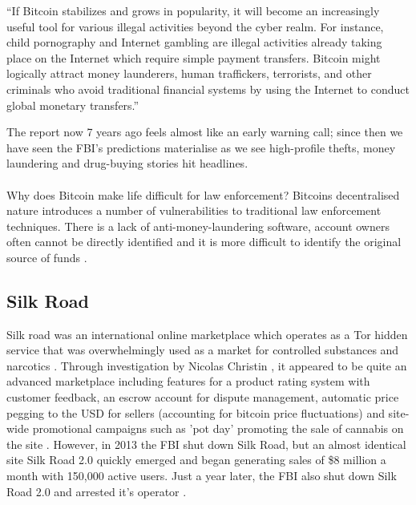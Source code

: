 \begin{displayquote}
 ``If Bitcoin stabilizes and grows in popularity, it will become an increasingly useful tool for various illegal activities beyond the cyber realm. For instance, child pornography and Internet gambling are illegal activities already taking place on the Internet which require simple payment transfers. Bitcoin might logically attract money launderers, human traffickers, terrorists, and other criminals who avoid traditional financial systems by using the Internet to conduct global monetary transfers.''
\end{displayquote}

The report now 7 years ago feels almost like an early warning call; since then we have seen the FBI's predictions materialise as we see high-profile thefts, money laundering and drug-buying stories hit headlines. 
\\\\
Why does Bitcoin make life difficult for law enforcement? Bitcoins decentralised nature introduces a number of vulnerabilities to traditional law enforcement techniques. There is a lack of anti-money-laundering software, account owners often cannot be directly identified and it is more difficult to identify the original source of funds \cite{RefWorks:doc:5c4ad055e4b0ea619646c15a}. 

\subsection{Silk Road}
Silk road was an international online marketplace which operates as a Tor hidden service that was overwhelmingly used as a market for controlled substances and narcotics \cite{RefWorks:doc:5c3e0105e4b0854ae612621e}. Through investigation by Nicolas Christin \cite{RefWorks:doc:5c3e0105e4b0854ae612621e}, it appeared to be quite an advanced marketplace including features for a product rating system with customer feedback, an escrow account for dispute management, automatic price pegging to the USD for sellers (accounting for bitcoin price fluctuations) and site-wide promotional campaigns such as 'pot day' promoting the sale of cannabis on the site \cite{RefWorks:doc:5c3e0105e4b0854ae612621e}. However, in 2013 the FBI shut down Silk Road, but an almost identical site Silk Road 2.0 quickly emerged and began generating sales of \$8 million a month with 150,000 active users. Just a year later, the FBI also shut down Silk Road 2.0 and arrested it's operator \cite{RefWorks:doc:5c4ae400e4b0613d0cdbb201}. 

